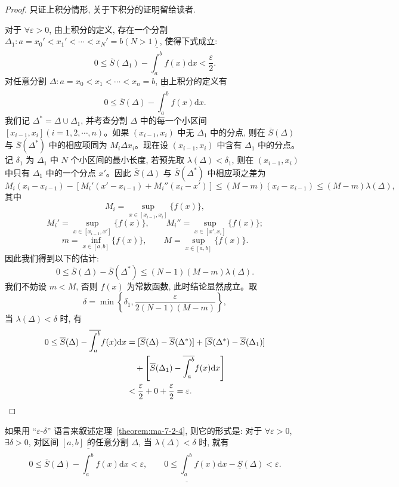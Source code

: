 \begin{proof}
只证上积分情形, 关于下积分的证明留给读者.

对于 $\forall\varepsilon>0$, 由上积分的定义, 存在一个分割 $\Delta_1:a=x_0'<x_1'<\cdots<x_N'=b(N>1)$, 使得下式成立:
\[
  0\leq \overline S(\Delta_1)-\overline{\int_a^b} f(x)\mathrm dx<\frac{\varepsilon}{2}.
\]
对任意分割 $\Delta:a=x_0<x_1<\cdots<x_n=b$, 由上积分的定义有
\[
  0\leq \overline S(\Delta)-\overline{\int_a^b} f(x)\mathrm dx.
\]
我们记 $\Delta^*=\Delta\cup\Delta_1$, 并考查分割 $\Delta$ 中的每一个小区间 $[x_{i-1},x_i](i=1,2,\cdots,n)$。如果 $(x_{i-1},x_i)$ 中无 $\Delta_1$ 中的分点, 则在 $\overline S(\Delta)$ 与 $\overline S(\Delta^*)$ 中的相应项同为 $M_i\Delta x_i$。现在设 $(x_{i-1},x_i)$ 中含有 $\Delta_1$ 中的分点。记 $\delta_1$ 为 $\Delta_1$ 中 $N$ 个小区间的最小长度, 若预先取 $\lambda(\Delta)<\delta_1$, 则在 $(x_{i-1},x_i)$ 中只有 $\Delta_1$ 中的一个分点 $x'$。因此 $\overline S(\Delta)$ 与 $\overline S(\Delta^*)$ 中相应项之差为
\[
  M_i(x_i-x_{i-1})-[M_i'(x'-x_{i-1})+M_i''(x_i-x')]
  \leq (M-m)(x_i-x_{i-1})\leq (M-m)\lambda(\Delta),
\]
其中
\[
  M_i=\sup_{x\in[x_{i-1},x_i]}\{f(x)\},
\]
\[
  M_i'=\sup_{x\in[x_{i-1},x']}\{f(x)\},\qquad
  M_i''=\sup_{x\in[x',x_i]}\{f(x)\};
\]
\[
  m=\inf_{x\in[a,b]}\{f(x)\},\qquad M=\sup_{x\in[a,b]}\{f(x)\}.
\]
因此我们得到以下的估计:
\[
  0\leq \overline S(\Delta)-\overline S(\Delta^*)\leq (N-1)(M-m)\lambda(\Delta).
\]
我们不妨设 $m<M$, 否则 $f(x)$ 为常数函数, 此时结论显然成立。取
\[
  \delta=\min\left\{\delta_1,\frac{\varepsilon}{2(N-1)(M-m)}\right\},
\]
当 $\lambda(\Delta)<\delta$ 时, 有
\[
\begin{aligned}
  0\leq \overline S(\Delta)-\overline{\int_a^b} f(x)\mathrm dx
  &=[\overline S(\Delta)-\overline S(\Delta^*)]+[\overline S(\Delta^*)-\overline S(\Delta_1)]\\
  &\quad+\left[\overline S(\Delta_1)-\overline{\int_a^b} f(x)\mathrm dx\right]\\
  &<\frac{\varepsilon}{2}+0+\frac{\varepsilon}{2}=\varepsilon.
\end{aligned}
\qedhere
\]
\end{proof}


\begin{remark}\label{remark:ma-7-source-18}
如果用 ``$\varepsilon$-$\delta$'' 语言来叙述定理~\ref{theorem:ma-7-2-4}, 则它的形式是: 对于 $\forall\varepsilon>0$, $\exists\delta>0$, 对区间 $[a,b]$ 的任意分割 $\Delta$, 当 $\lambda(\Delta)<\delta$ 时, 就有
\[
  0\leq \overline S(\Delta)-\overline{\int_a^b} f(x)\mathrm dx<\varepsilon,\qquad
  0\leq \underline{\int_a^b} f(x)\mathrm dx-\underline S(\Delta)<\varepsilon.
\]
\end{remark}

